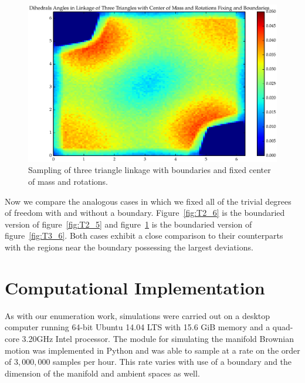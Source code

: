 \begin{figure}[ht]
\label{fig:T3_7}
\centering
  \includegraphics[scale=0.6]{images/T3_7_2D.eps}
\caption{Sampling of three triangle linkage with boundaries and fixed center of mass and rotations.}
\end{figure}


Now we compare the analogous cases in which we fixed all of the trivial degrees of freedom with and without a boundary. Figure~\ref{fig:T2_6} is the boundaried version of figure~\ref{fig:T2_5} and figure~\ref{fig:T3_7} is the boundaried version of figure~\ref{fig:T3_6}. Both cases exhibit a close comparison to their counterparts with the regions near the boundary possessing the largest deviations. 

\section{Computational Implementation}

As with our enumeration work, simulations were carried out on a desktop computer running 64-bit Ubuntu 14.04 LTS with 15.6 GiB memory and a quad-core 3.20GHz Intel processor. The module for simulating the manifold Brownian motion was implemented in Python and was able to sample at a rate on the order of $3,000,000$ samples per hour. This rate varies with use of a boundary and the dimension of the manifold and ambient spaces as well. 
